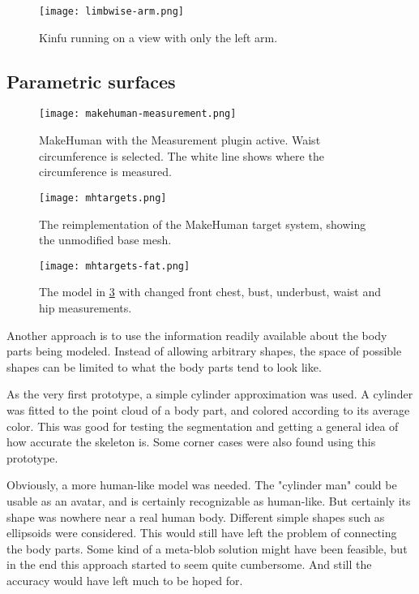 \begin{figure}
    \centering
    \texttt{[image: limbwise-arm.png]}
    \caption{Kinfu running on a view with only the left arm.}
    \label{fig:limbwise-arm}
\end{figure}

\subsection{Parametric surfaces}


\begin{figure}
    \centering
    \texttt{[image: makehuman-measurement.png]}
    \caption{MakeHuman with the Measurement plugin active. Waist circumference is selected. The white line shows where the circumference is measured.}
    \label{fig:makehuman-measurement}
\end{figure}

\begin{figure}
    \centering
    \texttt{[image: mhtargets.png]}
    \caption{The reimplementation of the MakeHuman target system, showing the unmodified base mesh.}
    \label{fig:mhtargets}
\end{figure}

\begin{figure}
    \centering
    \texttt{[image: mhtargets-fat.png]}
    \caption{The model in \ref{fig:mhtargets} with changed front chest, bust, underbust, waist and hip measurements.}
    \label{fig:mhtargets-fat}
\end{figure}

Another approach is to use the information readily available about the body parts being modeled. Instead of allowing arbitrary shapes, the space of possible shapes can be limited to what the body parts tend to look like.

As the very first prototype, a simple cylinder approximation was used. A cylinder was fitted to the point cloud of a body part, and colored according to its average color. This was good for testing the segmentation and getting a general idea of how accurate the skeleton is. Some corner cases were also found using this prototype.  

Obviously, a more human-like model was needed. The "cylinder man" could be usable as an avatar, and is certainly recognizable as human-like. But certainly its shape was nowhere near a real human body. Different simple shapes such as ellipsoids were considered. This would still have left the problem of connecting the body parts. Some kind of a meta-blob solution might have been feasible, but in the end this approach started to seem quite cumbersome. And still the accuracy would have left much to be hoped for.

